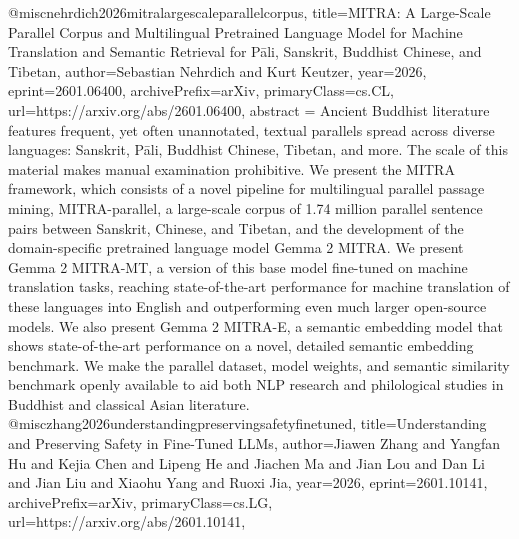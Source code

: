{}@misc{nehrdich2026mitralargescaleparallelcorpus,
      title={MITRA: A Large-Scale Parallel Corpus and Multilingual Pretrained Language Model for Machine Translation and Semantic Retrieval for P\=ali, Sanskrit, Buddhist Chinese, and Tibetan}, 
      author={Sebastian Nehrdich and Kurt Keutzer},
      year={2026},
      eprint={2601.06400},
      archivePrefix={arXiv},
      primaryClass={cs.CL},
      url={https://arxiv.org/abs/2601.06400},
      abstract = {Ancient Buddhist literature features frequent, yet often unannotated, textual parallels spread across diverse languages: Sanskrit, Pāli, Buddhist Chinese, Tibetan, and more. The scale of this material makes manual examination prohibitive. We present the MITRA framework, which consists of a novel pipeline for multilingual parallel passage mining, MITRA-parallel, a large-scale corpus of 1.74 million parallel sentence pairs between Sanskrit, Chinese, and Tibetan, and the development of the domain-specific pretrained language model Gemma 2 MITRA. We present Gemma 2 MITRA-MT, a version of this base model fine-tuned on machine translation tasks, reaching state-of-the-art performance for machine translation of these languages into English and outperforming even much larger open-source models. We also present Gemma 2 MITRA-E, a semantic embedding model that shows state-of-the-art performance on a novel, detailed semantic embedding benchmark. We make the parallel dataset, model weights, and semantic similarity benchmark openly available to aid both NLP research and philological studies in Buddhist and classical Asian literature.}
}@misc{zhang2026understandingpreservingsafetyfinetuned,
      title={Understanding and Preserving Safety in Fine-Tuned LLMs}, 
      author={Jiawen Zhang and Yangfan Hu and Kejia Chen and Lipeng He and Jiachen Ma and Jian Lou and Dan Li and Jian Liu and Xiaohu Yang and Ruoxi Jia},
      year={2026},
      eprint={2601.10141},
      archivePrefix={arXiv},
      primaryClass={cs.LG},
      url={https://arxiv.org/abs/2601.10141},
}
